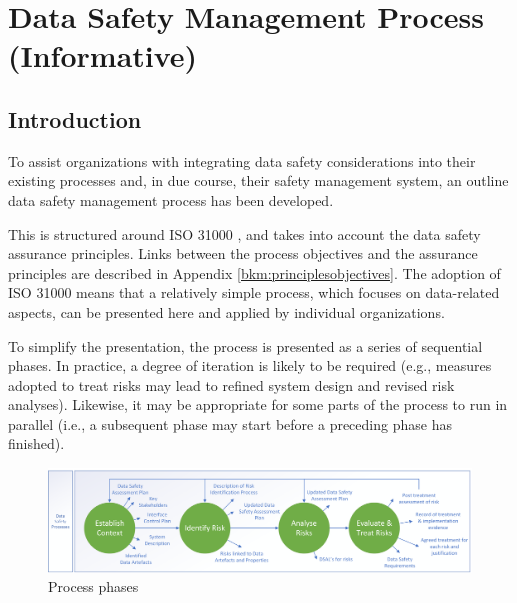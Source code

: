 %
%
\chapter{Data Safety Management Process (Informative)} \label{bkm:principlesprocess}


\section{Introduction}
To assist organizations with integrating data safety considerations into their existing processes and,
in due course, their safety management system, an outline data safety management process has
been developed.

This is structured around ISO 31000 \cite{citation:iso310002018risk}, and takes into account the data safety assurance principles.
Links between the process objectives and the assurance principles are described in Appendix \ref{bkm:principlesobjectives}. The
adoption of ISO 31000 means that a relatively simple process, which focuses on data-related
aspects, can be presented here and applied by individual organizations.

To simplify the presentation, the process is presented as a series of sequential phases. In practice, a
degree of iteration is likely to be required (e.g., measures adopted to \gls{treat} risks may lead to refined
system design and revised risk analyses). Likewise, it may be appropriate for some parts of the
process to run in parallel (i.e., a subsequent phase may start before a preceding phase has finished).
\begin{figure}[h]
\centering
\includegraphics[scale=0.45]{images/process diagram v3 Data Safety Only}
\caption{Process phases}
\label{fig:process_phases}
\end{figure}

